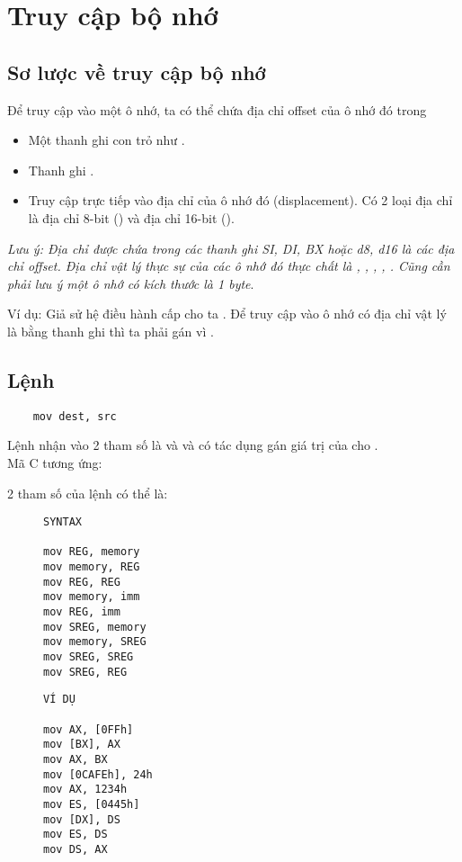 \documentclass[main.tex]{subfiles}
\begin{document}
\section{Truy cập bộ nhớ}
\subsection{Sơ lược về truy cập bộ nhớ}
Để truy cập vào một ô nhớ, ta có thể chứa địa chỉ offset của ô nhớ đó trong
\begin{itemize}
    \item Một thanh ghi con trỏ như .
    \item Thanh ghi .
    \item Truy cập trực tiếp vào địa chỉ của ô nhớ đó (displacement). Có 2 loại địa chỉ là địa chỉ 8-bit () và địa chỉ 16-bit ().
\end{itemize}

\textit{Lưu ý: Địa chỉ được chứa trong các thanh ghi SI, DI, BX hoặc d8, d16 là các địa chỉ offset. Địa chỉ vật lý thực sự của các ô nhớ đó thực chất là , , , , . Cũng cần phải lưu ý một ô nhớ có kích thước là 1 byte}.
\bigskip

Ví dụ: Giả sử hệ điều hành cấp cho ta .
Để truy cập vào ô nhớ có địa chỉ vật lý là  bằng thanh ghi  thì ta phải gán  vì .

\subsection{Lệnh }
\begin{verbatim}
    mov dest, src
\end{verbatim}
Lệnh  nhận vào 2 tham số là  và  và có tác dụng gán giá trị của  cho .\\
Mã C tương ứng: 

2 tham số của lệnh  có thể là:
\begin{figure}[H]
    \begin{minipage}{0.5\textwidth}
\begin{verbatim}
SYNTAX 

mov REG, memory
mov memory, REG
mov REG, REG
mov memory, imm
mov REG, imm
mov SREG, memory
mov memory, SREG 
mov SREG, SREG 
mov SREG, REG
\end{verbatim}
    \end{minipage}
    \hfill
        \begin{minipage}{0.5\textwidth}
\begin{verbatim}
VÍ DỤ 

mov AX, [0FFh]
mov [BX], AX
mov AX, BX
mov [0CAFEh], 24h
mov AX, 1234h
mov ES, [0445h]
mov [DX], DS 
mov ES, DS 
mov DS, AX
\end{verbatim}         
         \end{minipage}
\end{figure}
\end{document}

